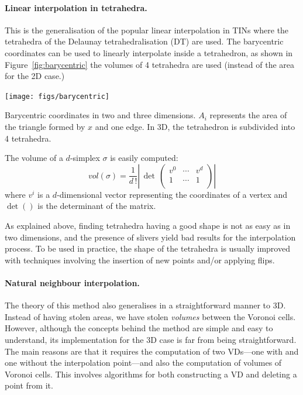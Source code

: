 \paragraph{Linear interpolation in tetrahedra.}
This is the generalisation of the popular linear interpolation in TINs where the tetrahedra of the Delaunay tetrahedralisation (DT) are used. 
The barycentric coordinates can be used to linearly interpolate inside a tetrahedron, as shown in Figure~\ref{fig:barycentric} the volumes of 4 tetrahedra are used (instead of the area for the 2D case.)
\begin{marginfigure}
  \centering
  \texttt{[image: figs/barycentric]}
  \caption{Barycentric coordinates in two and three dimensions. $A_i$ represents the area of the triangle formed by $x$ and one edge. In 3D, the tetrahedron is subdivided into 4 tetrahedra.}%
\label{fig:barycentric}
\end{marginfigure}

The volume of a $d$-simplex $\sigma$ is easily computed:
\begin{equation}
vol(\sigma) = \frac{1}{d \, !} \left| \,  
                            \det \, \left( 
                                  \begin{array}{ccc}
                                    v^{0} & \cdots & v^{d} \\
                                    1     & \cdots & 1 \\
                                  \end{array}
                                \right)
                        \right|
\end{equation}  
where $v^{i}$ is a $d$-dimensional vector representing the coordinates of a vertex and $\det()$ is the determinant of the matrix. 

As explained above, finding tetrahedra having a good shape is not as easy as in two dimensions, and the presence of slivers yield bad results for the interpolation process. 
To be used in practice, the shape of the tetrahedra is usually improved with techniques involving the insertion of new points and/or applying flips.


\paragraph{Natural neighbour interpolation.}
The theory of this method also generalises in a straightforward manner to 3D.
Instead of having stolen areas, we have stolen \emph{volumes} between the Voronoi cells.
However, although the concepts behind the method are simple and easy to understand, its implementation for the 3D case is far from being straightforward. 
The main reasons are that it requires the computation of two VDs---one with and one without the interpolation point---and also the computation of volumes of Voronoi cells. 
This involves algorithms for both constructing a VD and deleting a point from it.

